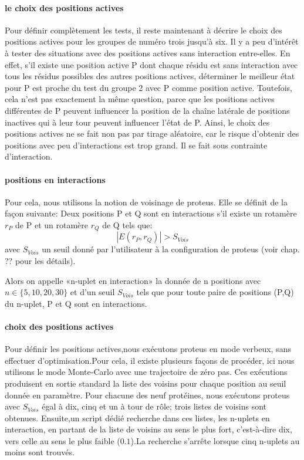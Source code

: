 \paragraph{le choix des positions actives}
\label{para:choix_posi}
Pour définir complètement les tests, il reste maintenant à décrire le choix des positions actives pour les groupes de numéro trois jusqu'à six.
Il y a peu d'intérêt à tester des situations avec des positions actives sans interaction entre-elles.
En effet, s'il existe une position active P dont chaque résidu est sans interaction avec tous les résidus possibles des autres positions actives, déterminer le meilleur état pour P est proche du test du groupe 2 avec P comme position active. Toutefois, cela n'est pas exactement la même question, parce que les positions actives différentes de P peuvent influencer la position de la chaîne latérale de positions inactives qui à leur tour peuvent influencer l'état de P.
Ainsi, le choix des positions actives ne se fait non pas par tirage aléatoire, car le risque d'obtenir des positions avec peu d'interactions est trop grand. Il se fait sous contrainte d'interaction.

\paragraph{positions en interactions}
Pour cela, nous utilisons la notion de voisinage de proteus. Elle se définit de la façon suivante:  
Deux positions P et Q sont en interactions s'il existe un rotamère $r_P$ de P et un rotamère $r_Q$ de Q tels que:
\begin{displaymath}
 | E(r_P,r_Q) | > S_{Vois}
\end{displaymath} 
avec $S_{Vois}$ un seuil donné par l'utilisateur à la configuration de proteus (voir chap. ?? pour les détails).

Alors on appelle «n-uplet en interaction» la donnée de n positions avec $n \in \{5,10,20,30\}$ et d'un seuil  $S_{Vois}$  tels que pour toute paire de positions (P,Q) du n-uplet, P et Q sont en interactions.
\paragraph{choix des  positions actives}
Pour définir les positions actives,nous exécutons proteus en mode verbeux, sans effectuer d'optimisation.Pour cela,
il existe plusieurs façons de procéder, ici nous utilisons le mode Monte-Carlo avec une trajectoire de zéro pas. Ces exécutions produisent en sortie standard la liste des voisins pour chaque position au seuil donnée en paramètre.
Pour chacune des neuf protéines, nous exécutons proteus avec $S_{Vois}$ égal à dix, cinq et un à tour de rôle; trois listes de voisins sont obtenues. 
Ensuite,un script dédié recherche dans ces listes, les n-uplets en interaction, en partant de la liste de voisins au sens le plus fort, c'est-à-dire dix, vers celle  au sens le plus faible ($0.1$).La recherche s'arrête lorsque cinq n-uplets au moins sont trouvés.

